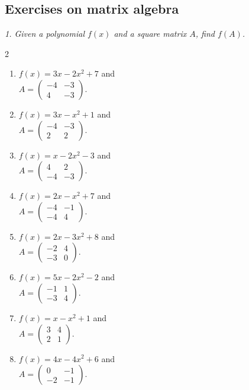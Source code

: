 \subsection{Exercises on matrix algebra}
\emph{1. Given a polynomial $f(x)$ and a square matrix $A$, find $f(A)$.}\bigskip
\begin{multicols}{2}\raggedright
\begin{enumerate}[label=\arabic*.,  leftmargin=*]
\item $f(x) = 3x - 2x^2 + 7$ and \\
$A = \begin{pmatrix} -4 & -3 \\ 4 & -3 \end{pmatrix}$.
\item $f(x) = 3x - x^2 + 1$ and \\
$A = \begin{pmatrix} -4 & -3 \\ 2 & 2 \end{pmatrix}$.
\item $f(x) = x - 2x^2 - 3$ and \\
$A = \begin{pmatrix} 4 & 2 \\ -4 & -3 \end{pmatrix}$.
\item $f(x) = 2x - x^2 + 7$ and \\
$A = \begin{pmatrix} -4 & -1 \\ -4 & 4 \end{pmatrix}$.
\item $f(x) = 2x - 3x^2 + 8$ and \\
$A = \begin{pmatrix} -2 & 4 \\ -3 & 0 \end{pmatrix}$.
\item $f(x) = 5x - 2x^2 - 2$ and \\
$A = \begin{pmatrix} -1 & 1 \\ -3 & 4 \end{pmatrix}$.
\item $f(x) = x - x^2 + 1$ and \\
$A = \begin{pmatrix} 3 & 4 \\ 2 & 1 \end{pmatrix}$.
\item $f(x) = 4x - 4x^2 + 6$ and \\
$A = \begin{pmatrix} 0 & -1 \\ -2 & -1 \end{pmatrix}$.

\end{enumerate}
\end{multicols}
